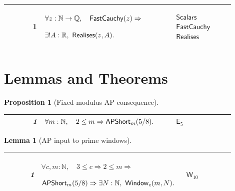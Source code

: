 \documentclass[12pt,reqno]{amsart}
\theoremstyle{blueplain}
\newtheorem{lemma}{Lemma}[section]
\newtheorem{proposition}{Proposition}[section]
\numberwithin{equation}{section}
\begin{document}
{\scriptsize \setlength{\parskip}{0pt}\nointerlineskip
\noindent 
\begin{tabular}{|@{}>{\centering\arraybackslash}m{0.10658\linewidth}|>{\centering\arraybackslash}m{0.03553\linewidth}|>{\centering\arraybackslash}m{0.52105\linewidth}|>{\centering\arraybackslash}m{0.23684\linewidth}|}
\hline
{\hypertarget{row:C1}{$\mathsf{C}$}} & {1} & {$\displaystyle \forall z:%
\mathbb{N}\to\mathbb{Q},\quad \hyperlink{def:FastCauchy}{\mathsf{FastCauchy} 
}(z)\Rightarrow$ \par$\displaystyle \exists!A:\mathbb{R},\ \hyperlink{def:Realises}%
{\mathsf{Realises} }(z,A).$} & {\hyperlink{def:Scalars}{$\mathsf{Scalars}$} 
\hyperlink{def:FastCauchy}{$\mathsf{FastCauchy}$} \hyperlink{def:Realises}{$%
\mathsf{Realises}$}} \\ \hline
\end{tabular}%
}

\section{Lemmas and Theorems}

\label{sec:theorems}

\begin{proposition}[Fixed-modulus AP consequence]
\label{prop:ap-input} {\scriptsize \setlength{\parskip}{0pt}\noindent 
\begin{tabular}{|@{}>{\centering\arraybackslash}m{0.10658\linewidth}|>{\centering\arraybackslash}m{0.03553\linewidth}|>{\centering\arraybackslash}m{0.52105\linewidth}|>{\centering\arraybackslash}m{0.23684\linewidth}|}
\hline
{\hypertarget{row:A1}{$\mathsf{A}$}} & {1} & {$\displaystyle \forall m:%
\mathbb{N},\quad2\le m\Rightarrow \hyperlink{def:APShort}{\mathsf{APShort} }%
_m(5/8).$} & {\hyperlink{row:E5}{$\mathsf{E}_{5}$}} \\ \hline
\end{tabular}
}
\end{proposition}

\begin{lemma}[AP input to prime windows]
\label{lem:ap-window} {\scriptsize \setlength{\parskip}{0pt}\noindent 
\begin{tabular}{|@{}>{\centering\arraybackslash}m{0.10658\linewidth}|>{\centering\arraybackslash}m{0.03553\linewidth}|>{\centering\arraybackslash}m{0.52105\linewidth}|>{\centering\arraybackslash}m{0.23684\linewidth}|}
\hline
{\hypertarget{row:T1}{$\mathsf{T}$}} & {1} & {$\displaystyle \forall c,m:%
\mathbb{N},\quad3\le c\Rightarrow2\le m\Rightarrow$ \par$\displaystyle 
\hyperlink{def:APShort}{\mathsf{APShort} }_m(5/8)\Rightarrow\exists N:%
\mathbb{N},\ \hyperlink{def:Window}{\mathsf{Window} }_c(m,N).$} & {\ 
\hyperlink{row:W10}{$\mathsf{W}_{10}$}} \\ \hline
\end{tabular}%
}
\end{lemma}
\end{document}
